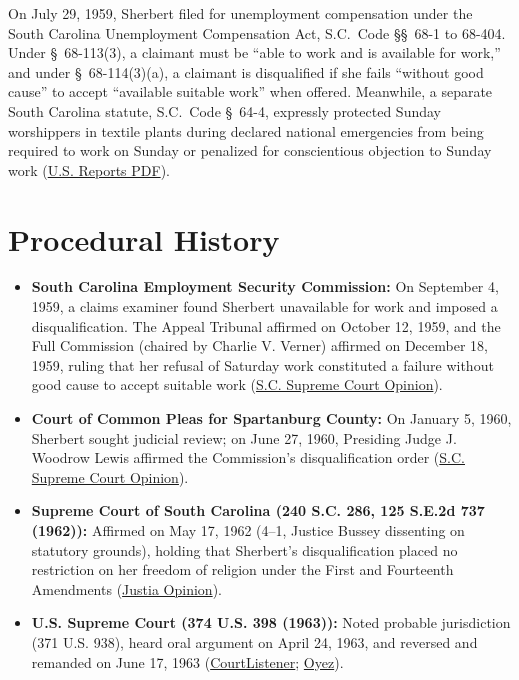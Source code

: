 \documentclass[12pt]{article}
\begin{document}
On July 29, 1959, Sherbert filed for unemployment compensation under the South Carolina Unemployment Compensation Act, S.C.\ Code \S\S~68-1 to 68-404. Under \S~68-113(3), a claimant must be ``able to work and is available for work,'' and under \S~68-114(3)(a), a claimant is disqualified if she fails ``without good cause'' to accept ``available suitable work'' when offered. Meanwhile, a separate South Carolina statute, S.C.\ Code \S~64-4, expressly protected Sunday worshippers in textile plants during declared national emergencies from being required to work on Sunday or penalized for conscientious objection to Sunday work (\href{https://tile.loc.gov/storage-services/service/ll/usrep/usrep374/usrep374398/usrep374398.pdf}{U.S. Reports PDF}).

\section{Procedural History}

\begin{itemize}
\item \textbf{South Carolina Employment Security Commission:} On September 4, 1959, a claims examiner found Sherbert unavailable for work and imposed a disqualification. The Appeal Tribunal affirmed on October 12, 1959, and the Full Commission (chaired by Charlie V. Verner) affirmed on December 18, 1959, ruling that her refusal of Saturday work constituted a failure without good cause to accept suitable work (\href{https://law.justia.com/cases/south-carolina/supreme-court/1962/17915-1.html}{S.C. Supreme Court Opinion}).
\item \textbf{Court of Common Pleas for Spartanburg County:} On January 5, 1960, Sherbert sought judicial review; on June 27, 1960, Presiding Judge J. Woodrow Lewis affirmed the Commission's disqualification order (\href{https://law.justia.com/cases/south-carolina/supreme-court/1962/17915-1.html}{S.C. Supreme Court Opinion}).
\item \textbf{Supreme Court of South Carolina (240 S.C. 286, 125 S.E.2d 737 (1962)):} Affirmed on May 17, 1962 (4--1, Justice Bussey dissenting on statutory grounds), holding that Sherbert's disqualification placed no restriction on her freedom of religion under the First and Fourteenth Amendments (\href{https://supreme.justia.com/cases/federal/us/374/398/}{Justia Opinion}).
\item \textbf{U.S. Supreme Court (374 U.S. 398 (1963)):} Noted probable jurisdiction (371 U.S. 938), heard oral argument on April 24, 1963, and reversed and remanded on June 17, 1963 (\href{https://www.courtlistener.com/opinion/106660/sherbert-v-verner/}{CourtListener}; \href{https://www.oyez.org/cases/1962/526}{Oyez}).
\end{itemize}
\end{document}
